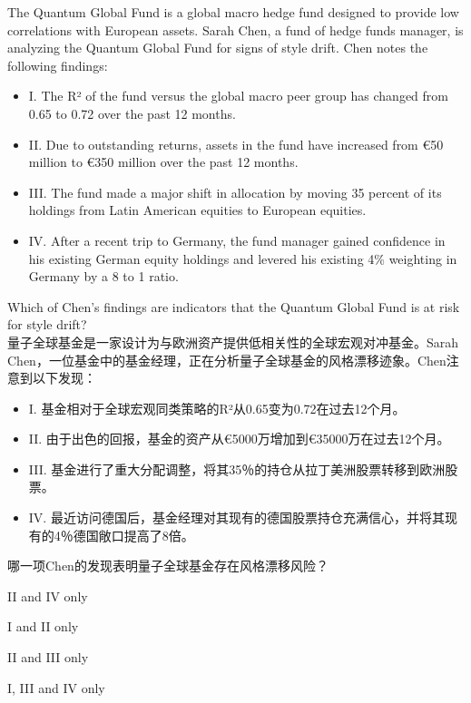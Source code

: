 \documentclass{article}
\newcounter{question} %
\begin{document}
\begin{question}
    The Quantum Global Fund is a global macro hedge fund designed to provide low correlations with European assets. Sarah Chen, a fund of hedge funds manager, is analyzing the Quantum Global Fund for signs of style drift. Chen notes the following findings: 
    \begin{itemize}
        \item I. The R² of the fund versus the global macro peer group has changed from 0.65 to 0.72 over the past 12 months.  
        \item II. Due to outstanding returns, assets in the fund have increased from €50 million to €350 million over the past 12 months.  
        \item III. The fund made a major shift in allocation by moving 35 percent of its holdings from Latin American equities to European equities.  
        \item IV. After a recent trip to Germany, the fund manager gained confidence in his existing German equity holdings and levered his existing 4\% weighting in Germany by a 8 to 1 ratio.  
    \end{itemize}
    Which of Chen's findings are indicators that the Quantum Global Fund is at risk for style drift?
    \\量子全球基金是一家设计为与欧洲资产提供低相关性的全球宏观对冲基金。Sarah Chen，一位基金中的基金经理，正在分析量子全球基金的风格漂移迹象。Chen注意到以下发现：
    \begin{itemize}
        \item I. 基金相对于全球宏观同类策略的R²从0.65变为0.72在过去12个月。
        \item II. 由于出色的回报，基金的资产从€5000万增加到€35000万在过去12个月。
        \item III. 基金进行了重大分配调整，将其35％的持仓从拉丁美洲股票转移到欧洲股票。
        \item IV. 最近访问德国后，基金经理对其现有的德国股票持仓充满信心，并将其现有的4％德国敞口提高了8倍。
    \end{itemize}
    哪一项Chen的发现表明量子全球基金存在风格漂移风险？
\end{question}

\begin{choices}
    \item II and IV only
    \item I and II only
    \item II and III only
    \item I, III and IV only
\end{choices}
\end{document}
